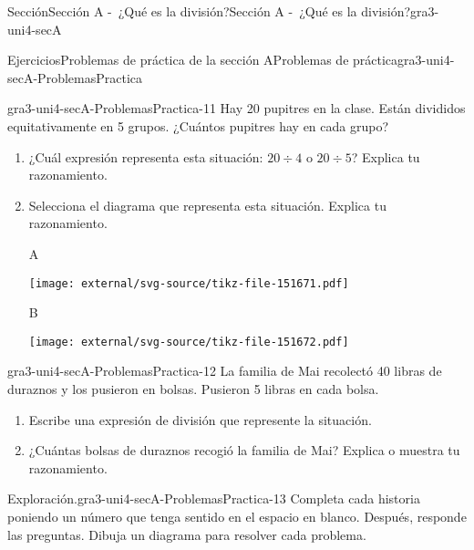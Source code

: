 \documentclass[twoside,14pt,]{extarticle}
\begin{document}
\begin{sectionptx}{Sección}{Sección A -~¿Qué es la división?}{}{Sección A -~¿Qué es la división?}{}{}{gra3-uni4-secA}
\begin{exercises-subsection}{Ejercicios}{Problemas de práctica de la sección A}{}{Problemas de práctica}{}{}{gra3-uni4-secA-ProblemasPractica}
\begin{divisionexercise}{9}{}{}{gra3-uni4-secA-ProblemasPractica-11}
Hay 20 pupitres en la clase. Están divididos equitativamente en 5 grupos. ¿Cuántos pupitres hay en cada grupo?%
\par
%
\begin{enumerate}[label=(\alph*)]
\item{}¿Cuál expresión representa esta situación: \(20\div 4\) o \(20\div 5\)? Explica tu razonamiento.%
\item{}Selecciona el diagrama que representa esta situación. Explica tu razonamiento.%
\begin{sidebyside}{2}{0}{0}{0}%
\begin{sbspanel}{0.05}%
A%
\end{sbspanel}%
\begin{sbspanel}{0.95}%
\texttt{[image: external/svg-source/tikz-file-151671.pdf]}
\end{sbspanel}%
\end{sidebyside}%
\begin{sidebyside}{2}{0}{0}{0}%
\begin{sbspanel}{0.05}%
B%
\end{sbspanel}%
\begin{sbspanel}{0.95}%
\texttt{[image: external/svg-source/tikz-file-151672.pdf]}
\end{sbspanel}%
\end{sidebyside}%
\end{enumerate}
%
\end{divisionexercise}%
\begin{divisionexercise}{10}{}{}{gra3-uni4-secA-ProblemasPractica-12}%
La familia de Mai recolectó 40 libras de duraznos y los pusieron en bolsas. Pusieron 5 libras en cada bolsa.%
\par
%
\begin{enumerate}[label=(\alph*)]
\item{}Escribe una expresión de división que represente la situación.%
\item{}¿Cuántas bolsas de duraznos recogió la familia de Mai? Explica o muestra tu razonamiento.%
\end{enumerate}
%
\end{divisionexercise}%
\begin{divisionexercise}{11}{Exploración.}{}{gra3-uni4-secA-ProblemasPractica-13}%
Completa cada historia poniendo un número que tenga sentido en el espacio en blanco. Después, responde las preguntas. Dibuja un diagrama para resolver cada problema.%
\par

\end{divisionexercise}
\end{exercises-subsection}
\end{sectionptx}
\end{document}
